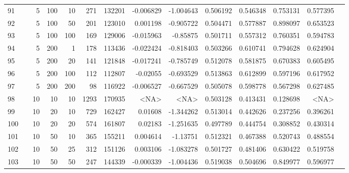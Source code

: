 \begin{longtable}{llrrrrrrrrrrrr}
		91  & &            5 &               100 &           10 &         271 &     132201 & -0.006829 & -1.004643 &  0.506192 &    0.546348 &       0.753131 &  0.577395 \\
		92  & &            5 &               100 &           50 &         201 &     123010 &  0.001198 & -0.905722 &  0.504471 &    0.577887 &       0.898097 &  0.653523 \\
		93  & &            5 &               100 &          100 &         169 &     129006 & -0.015963 &  -0.85875 &  0.501711 &    0.557312 &       0.760351 &  0.594783 \\
		94  & &            5 &               200 &            1 &         178 &     113436 & -0.022424 & -0.818403 &  0.503266 &    0.610741 &       0.794628 &  0.624904 \\
		95  & &            5 &               200 &           20 &         141 &     121848 & -0.017241 & -0.785749 &  0.512078 &    0.581875 &       0.670383 &  0.605495 \\
		96  & &            5 &               200 &          100 &         112 &     112807 &  -0.02055 & -0.693529 &  0.513863 &    0.612899 &       0.597196 &  0.617952 \\
		97  & &            5 &               200 &          200 &          98 &     116922 & -0.006527 & -0.667529 &  0.505078 &    0.598778 &       0.567298 &  0.627485 \\
		98  & &           10 &                10 &           10 &           1293 &     170935 &      <NA> &      <NA> &  0.503128 &    0.413431 &       0.128698 &  <NA> \\
		99  & &           10 &                20 &           10 &         729 &     162427 &   0.01608 & -1.344262 &  0.513014 &    0.442626 &       0.237256 &  0.396261 \\
		100 & &           10 &                20 &           20 &         574 &     161807 &   0.02183 & -1.251635 &  0.497789 &    0.444754 &       0.308852 &  0.430314 \\
		101 & &           10 &                50 &           10 &         365 &     155211 &  0.004614 &  -1.13751 &  0.512321 &    0.467388 &       0.520743 &  0.488554 \\
		102 & &           10 &                50 &           25 &         312 &     151126 &  0.003106 & -1.083278 &  0.501727 &    0.481406 &       0.630422 &  0.519758 \\
		103 & &           10 &                50 &           50 &         247 &     144339 & -0.000339 & -1.004436 &  0.519038 &    0.504696 &       0.849977 &  0.596977 \\

\end{longtable}
